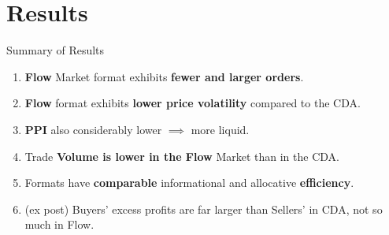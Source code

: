 \documentclass[10pt]{beamer}
\begin{document}
\section{Results}

\begin{frame}{Summary of Results}

\begin{enumerate}
    \item[R1:] \textbf{Flow} Market format exhibits \textbf{fewer and larger orders}.  %

    
    \item[R2:] \textbf{Flow} format exhibits \textbf{lower price volatility} compared to the CDA.\\  %
   
     \item[R3:] \textbf{PPI} also considerably lower $\implies$ more liquid. \\  %
    \vspace{0.5cm}
    
    \item[R4:] Trade \textbf{Volume is lower in the Flow} Market than in the CDA.  %
    
    \item[R5:] Formats have \textbf{comparable} informational and allocative \textbf{efficiency}. %
  \vspace{0.5cm}
    \item[R6:] (ex post) Buyers' excess profits are far larger than Sellers' in CDA, not so much in Flow. 
    
\end{enumerate}



\end{frame}
\end{document}
